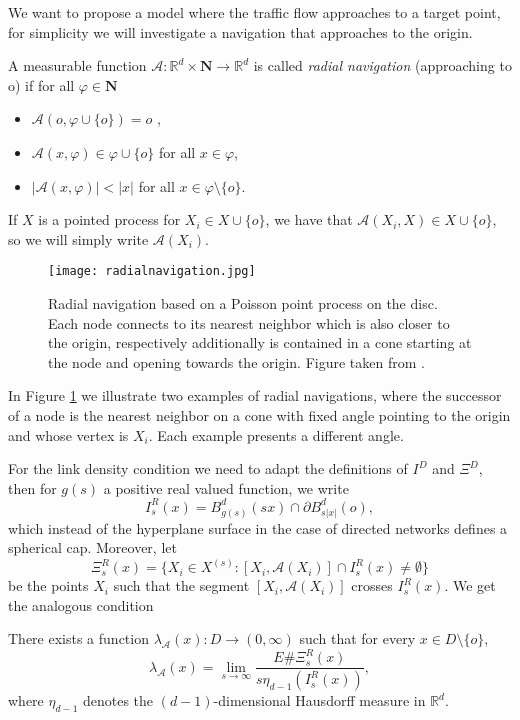 We want to propose a model where the traffic flow approaches to a target point, for simplicity we will investigate a navigation that approaches to the origin. 
\begin{defn} A measurable function $\mathcal{A}:\mathbb{R}^d\times\textbf{N}\rightarrow\mathbb{R}^d$ is called \textit{radial navigation} (approaching to o)  if for all $\varphi\in\textbf{N}$
\begin{itemize}
\item $\mathcal{A}(o,\varphi\cup \lbrace o\rbrace)=o$ ,
\item $\mathcal{A}(x, \varphi)\in\varphi\cup\lbrace o\rbrace$ for all $x\in\varphi$,
\item $\vert\mathcal{A}(x, \varphi)\vert<\vert x\vert$ for all $x\in\varphi\setminus\lbrace o\rbrace$.
\end{itemize}
If $X$ is a pointed process for $X_{i}\in X\cup\lbrace o\rbrace$, we have that $\mathcal{A}(X_i, X)\in X\cup\lbrace o\rbrace$, so we will simply write $\mathcal{A}(X_i)$.
\end{defn}
\begin{figure}
\captionsetup{width=1\textwidth}
\centering
\texttt{[image: radialnavigation.jpg]}
\caption{Radial navigation based on a Poisson point process on the disc. Each node connects to its nearest neighbor which is also closer to the origin, respectively additionally is contained in a cone starting at the node and opening towards the origin. Figure taken from \cite{WIAS}.}
\label{fig.3.1}
\end{figure}
In Figure \ref{fig.3.1} we illustrate two examples of radial navigations, where the successor of a node is the nearest neighbor on a cone with fixed angle pointing to the origin and whose vertex is $X_i$. Each example presents a different angle. 

For the link density condition we need to adapt the definitions of $I^D$ and $\Xi^D$, then for $g(s)$ a positive real valued function, we write $$I^R_s(x)=B^d_{g(s)}(sx)\cap\partial B^d_{s\vert x\vert}(o), $$ which instead of the hyperplane surface in the case of directed networks defines a spherical cap. Moreover, let $$\Xi_s^R(x)=\lbrace X_i\in X^{(s)}:[X_i,\mathcal{A}(X_i)]\cap I_s^R(x)\neq \emptyset\rbrace $$ be the points $X_i$ such that the segment $[X_i,\mathcal{A}(X_i)]$ crosses $I_s^R(x)$. We get the analogous condition

 \begin{con}\label{con3} There exists a function $\lambda_\mathcal{A}(x):D\rightarrow(0,\infty)$ such that for every $x\in D\setminus\lbrace o\rbrace$,
 $$\lambda_\mathcal{A}(x)=\lim_{s\rightarrow\infty}\frac{E\#\Xi_s^R(x)}{s\eta _{d-1}(I_s^R(x))}, $$ where $\eta_{d-1}$ denotes the $(d-1)$-dimensional Hausdorff measure in $\mathbb{R}^d$.
 \end{con}
 
